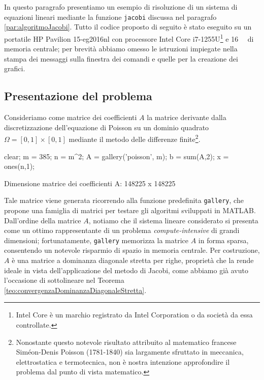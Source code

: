 In questo paragrafo presentiamo un esempio di risoluzione di un sistema di equazioni lineari mediante la funzione
\lstinline{jacobi} discussa nel paragrafo \ref{par:algoritmoJacobi}. \newline
Tutto il codice proposto di seguito \`e stato eseguito su un portatile HP Pavilion 15-eg2016nl con processore Intel\textsuperscript{\textregistered} Core\textsuperscript{\texttrademark} i7-1255U\footnote{Intel Core \`e un marchio registrato da Intel Corporation o da societ\`a da essa controllate.} e \qty{16}{\giga\byte} di memoria centrale; per brevit\`a abbiamo omesso le istruzioni impiegate nella stampa dei messaggi sulla finestra dei comandi e quelle per la creazione dei grafici.
\subsection{Presentazione del problema}
Consideriamo come matrice dei coefficienti $A$ la matrice derivante dalla discretizzazione dell'equazione di Poisson su un
dominio quadrato $\Omega=[0, 1]\times[0, 1]$ mediante il metodo delle differenze finite\footnote{
    Nonostante questo notevole risultato attribuito al matematico francese Sim\'eon-Denis Poisson (1781-1840) sia largamente sfruttato in meccanica,
    elettrostatica e termotecnica, non \`e nostra intenzione approfondire il problema dal punto di vista matematico.}.
\begin{matlabcode}
    clear;
    m = 385;
    n = m^2;
    A = gallery('poisson', m);
    b = sum(A,2);
    x = ones(n,1);
\end{matlabcode}
\begin{matlaboutput}
    Dimensione matrice dei coefficienti A: 148225 x 148225
\end{matlaboutput}
Tale matrice viene generata ricorrendo alla funzione predefinita \lstinline{gallery}, che propone una famiglia di matrici per testare gli algoritmi sviluppati in MATLAB.\newline
Dall'ordine della matrice $A$, notiamo che il sistema lineare considerato si presenta come un ottimo rappresentante
di un problema \textit{compute-intensive} di grandi dimensioni; fortunatamente, \lstinline{gallery} memorizza la matrice $A$ in
forma sparsa, consentendo un notevole risparmio di spazio in memoria centrale.\newline
Per costruzione, $A$ \`e una matrice a dominanza diagonale stretta per righe, propriet\`a che la rende ideale
in vista dell'applicazione del metodo di Jacobi, come abbiamo gi\`a avuto l'occasione di sottolineare nel Teorema
\ref{teo:convergenzaDominanzaDiagonaleStretta}.

